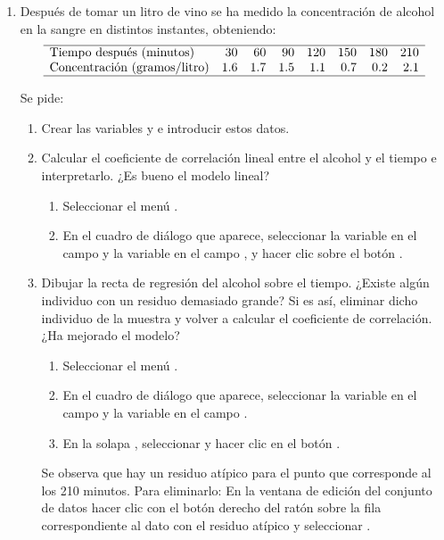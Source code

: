 \begin{enumerate}[leftmargin=*]
\item Después de tomar un litro de vino se ha medido la concentración de alcohol en la sangre en distintos instantes,
obteniendo:
\[
\begin{array}{lrrrrrrr}
\hline 
\mbox{Tiempo después (minutos)} & 30 & 60 & 90 & 120 & 150 & 180 & 210\\ 
\mbox{Concentración (gramos/litro)} & 1.6 & 1.7 & 1.5 & 1.1 & 0.7 & 0.2 & 2.1\\
\hline
\end{array}
\]

Se pide:
\begin{enumerate}
\item Crear las variables  y  e introducir estos datos.
\item Calcular el coeficiente de correlación lineal entre el alcohol y el tiempo e interpretarlo. ¿Es bueno el modelo
lineal? 
\begin{indicacion}{
\begin{enumerate}
\item Seleccionar el menú .
\item En el cuadro de diálogo que aparece, seleccionar la variable  en el campo  y la variable  en el campo , y hacer clic sobre el botón
.
\end{enumerate}}
\end{indicacion}

\item Dibujar la recta de regresión del alcohol sobre el tiempo. 
¿Existe algún individuo con un residuo demasiado grande? 
Si es así, eliminar dicho individuo de la muestra y volver a calcular el coeficiente de correlación. 
¿Ha mejorado el modelo?
\begin{indicacion}{
\begin{enumerate}
\item Seleccionar el menú .
\item En el cuadro de diálogo que aparece, seleccionar la variable  en el campo  y
la variable  en el campo .
\item En la solapa , seleccionar  y hacer clic en el botón .
\end{enumerate}
Se observa que hay un residuo atípico para el punto que corresponde al los 210 minutos. 
Para eliminarlo:
En la ventana de edición del conjunto de datos hacer clic con el botón derecho del ratón sobre la fila correspondiente
al dato con el residuo atípico y seleccionar .}
\end{indicacion}


\end{enumerate}
\end{enumerate}
